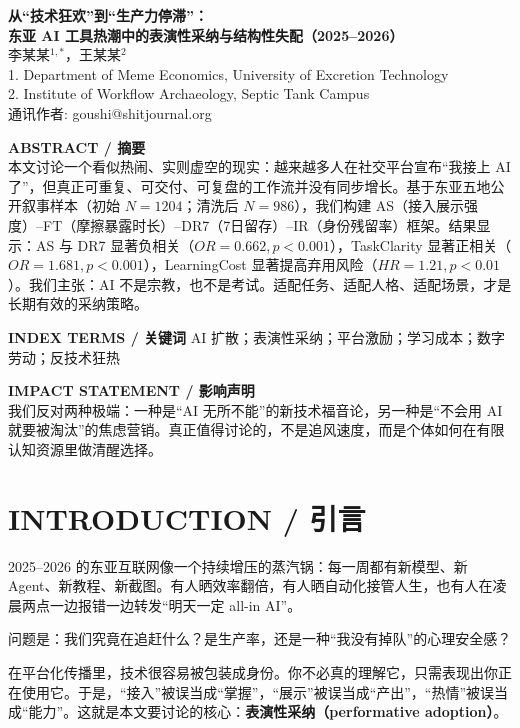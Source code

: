 \documentclass[11pt,a4paper]{ctexart}
\begin{document}
\begin{center}
{\Large\bfseries\color{purple} 从“技术狂欢”到“生产力停滞”：\\
东亚 AI 工具热潮中的表演性采纳与结构性失配（2025--2026）}\\[0.5em]
李某某$^{1,*}$，王某某$^2$\\
\small 1. Department of Meme Economics, University of Excretion Technology\\
\small 2. Institute of Workflow Archaeology, Septic Tank Campus\\
\small *通讯作者: goushi@shitjournal.org
\end{center}

\vspace{0.4em}
\noindent\textbf{ABSTRACT / 摘要}\\
本文讨论一个看似热闹、实则虚空的现实：越来越多人在社交平台宣布“我接上 AI 了”，但真正可重复、可交付、可复盘的工作流并没有同步增长。基于东亚五地公开叙事样本（初始 $N=1204$；清洗后 $N=986$），我们构建 AS（接入展示强度）--FT（摩擦暴露时长）--DR7（7日留存）--IR（身份残留率）框架。结果显示：AS 与 DR7 显著负相关（$OR=0.662, p<0.001$），TaskClarity 显著正相关（$OR=1.681, p<0.001$），LearningCost 显著提高弃用风险（$HR=1.21, p<0.01$）。我们主张：AI 不是宗教，也不是考试。适配任务、适配人格、适配场景，才是长期有效的采纳策略。

\vspace{0.5em}
\noindent\textbf{INDEX TERMS / 关键词} AI 扩散；表演性采纳；平台激励；学习成本；数字劳动；反技术狂热

\vspace{0.5em}
\noindent\textbf{IMPACT STATEMENT / 影响声明}\\
我们反对两种极端：一种是“AI 无所不能”的新技术福音论，另一种是“不会用 AI 就要被淘汰”的焦虑营销。真正值得讨论的，不是追风速度，而是个体如何在有限认知资源里做清醒选择。

\section{INTRODUCTION / 引言}
2025--2026 的东亚互联网像一个持续增压的蒸汽锅：每一周都有新模型、新 Agent、新教程、新截图。有人晒效率翻倍，有人晒自动化接管人生，也有人在凌晨两点一边报错一边转发“明天一定 all-in AI”。

问题是：我们究竟在追赶什么？是生产率，还是一种“我没有掉队”的心理安全感？

在平台化传播里，技术很容易被包装成身份。你不必真的理解它，只需表现出你正在使用它。于是，“接入”被误当成“掌握”，“展示”被误当成“产出”，“热情”被误当成“能力”。这就是本文要讨论的核心：\textbf{表演性采纳（performative adoption）}。
\end{document}
